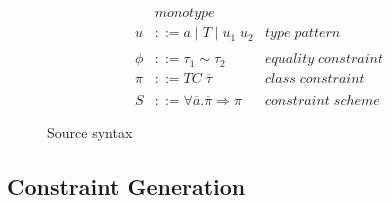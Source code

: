 \begin{figure}[h]
\begin{align*}
         &monotype \\
    u &::= a \mid T \mid u_1 \; u_2 &type \; pattern \\
    \\
    \phi &::= \tau_1 \sim \tau_2 &equality \; constraint \\
    \pi &::= TC \; \overline{\tau} &class \; constraint \\
    \\
    S &::= \forall \overline{a}. \overline{\pi} \Rightarrow \pi &constraint \;
    scheme
\end{align*}
\caption{Source syntax}
\label{source-syntax}
\end{figure}

\subsection{Constraint Generation}
